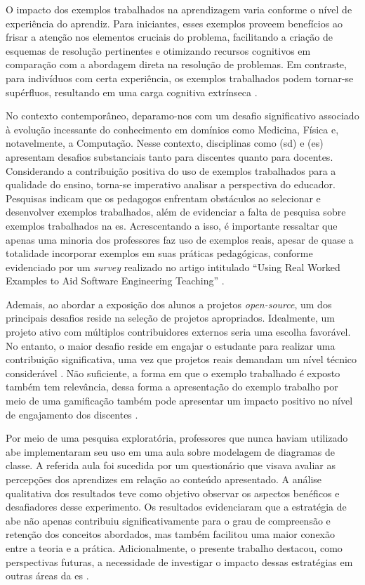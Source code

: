 {O impacto dos exemplos trabalhados na aprendizagem varia conforme o nível de experiência do aprendiz. Para iniciantes, esses exemplos proveem benefícios ao frisar a atenção nos elementos cruciais do problema, facilitando a criação de esquemas de resolução pertinentes e otimizando recursos cognitivos em comparação com a abordagem direta na resolução de problemas. Em contraste, para indivíduos com certa experiência, os exemplos trabalhados podem tornar-se supérfluos, resultando em uma carga cognitiva extrínseca \cite{Skudder-LuxtonReilly:2014}.

No contexto contemporâneo, deparamo-nos com um desafio significativo associado à evolução incessante do conhecimento em domínios como Medicina, Física e, notavelmente, a Computação. Nesse contexto, disciplinas como (\gls{sd}) e (\gls{es}) apresentam desafios substanciais tanto para discentes quanto para docentes. Considerando a contribuição positiva do uso de exemplos trabalhados para a qualidade do ensino, torna-se imperativo analisar a perspectiva do educador. Pesquisas indicam que os pedagogos enfrentam obstáculos ao selecionar e desenvolver exemplos trabalhados, além de evidenciar a falta de pesquisa sobre exemplos trabalhados na \gls{es}. Acrescentando a isso, é importante ressaltar que apenas uma minoria dos professores faz uso de exemplos reais, apesar de quase a totalidade incorporar exemplos em suas práticas pedagógicas, conforme evidenciado por um \textit{survey} realizado no artigo intitulado ``Using Real Worked Examples to Aid Software Engineering Teaching'' \cite{Simone.Tonhao-etal:2021}.

Ademais, ao abordar a exposição dos alunos a projetos \textit{open-source}, um dos principais desafios reside na seleção de projetos apropriados. Idealmente, um projeto ativo com múltiplos contribuidores externos seria uma escolha favorável. No entanto, o maior desafio reside em engajar o estudante para realizar uma contribuição significativa, uma vez que projetos reais demandam um nível técnico considerável \cite{OSSProjects-TheProfessors'Perspective}. Não suficiente, a forma em que o exemplo trabalhado é exposto também tem relevância, dessa forma a apresentação do exemplo trabalho por meio de uma gamificação também pode apresentar um impacto positivo no nível de engajamento dos discentes \cite{Simone.Tonhao-etal:2022}.

Por meio de uma pesquisa exploratória, professores que nunca haviam utilizado \gls{abe}
implementaram seu uso em uma aula sobre modelagem de diagramas de classe. A referida aula foi sucedida por um questionário que visava avaliar as percepções dos aprendizes em relação ao conteúdo apresentado. A análise qualitativa dos resultados teve como objetivo observar os aspectos benéficos e desafiadores desse experimento. Os resultados evidenciaram que a estratégia de \gls{abe} não apenas contribuiu significativamente para o grau de compreensão e retenção dos conceitos abordados, mas também facilitou uma maior conexão entre a teoria e a prática. Adicionalmente, o presente trabalho destacou, como perspectivas futuras, a necessidade de investigar o impacto dessas estratégias em outras áreas da \gls{es} \cite{Tiago.Bonetti-etal:2023}.

}
